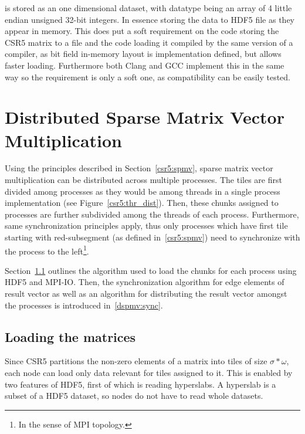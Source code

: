 \documentclass[thesis=M,english]{FITthesis}[2019/12/23]
\begin{document}
 is stored as an one dimensional dataset, with datatype being
an array of 4 little endian unsigned 32-bit integers. In essence storing the data to HDF5 file as
they appear in memory. This does put a soft requirement on the code storing the CSR5 matrix to a file
and the code loading it compiled by the same version of a compiler, as
bit field in-memory layout is implementation defined, but allows faster loading. Furthermore both
Clang and GCC implement this in the same way so the requirement is only a soft one, as compatibility can
be easily tested.



\chapter{Distributed Sparse Matrix Vector Multiplication}

Using the principles described in Section~\ref{csr5:spmv}, sparse matrix vector multiplication can be
distributed across multiple processes. The tiles are first divided among processes as they would be
among threads in a single process implementation (see Figure~\ref{csr5:thr_dist}). Then, these chunks
assigned to processes are further subdivided among the threads of each process. Furthermore, same
synchronization principles apply, thus only processes which have first tile starting with red-subsegment
(as defined in~\ref{csr5:spmv}) need to synchronize with the process to the
left\footnote{In the sense of MPI topology.}.

Section~\ref{dspmv:load} outlines the algorithm used to load the chunks for each process using HDF5 and
MPI-IO. Then, the synchronization algorithm for edge elements of result vector as well as an algorithm for
distributing the result vector amongst the processes is introduced in~\ref{dspmv:sync}.





\section{Loading the matrices}\label{dspmv:load}

Since CSR5 partitions the non-zero elements of a matrix into tiles of
size \(\sigma * \omega\), each node can load only data relevant for tiles
assigned to it. This is enabled by two features of HDF5, first of which
is reading hyperslabs. A hyperslab is a subset of a HDF5 dataset, so
nodes do not have to read whole datasets.
\end{document}
